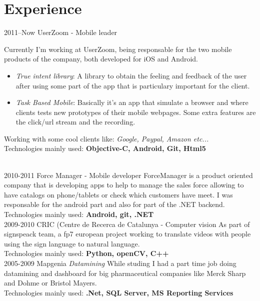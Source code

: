 \documentclass[]{friggeri-cv} %
\begin{document}
\section{Experience}
\begin{entrylist}
\entry
{2011--Now}
{UserZoom - Mobile leader}
{}
{
Currently I'm working at UserZoom, being responsable for the two mobile products of the company, both developed for iOS and Android.

\vspace{\parsep}


\begin{itemize}
\item \emph{True intent library}: A library to obtain the feeling and feedback of the user after using some part of the app that is particulary important for the client.

\vspace{\parsep}
\item \emph{Task Based Mobile}: Basically it's an app that simulate a browser and where clients tests new prototypes of their mobile webpages. Some extra features are the click/url stream and the recording.
\vspace{\parsep}
\end{itemize}
\vspace{\parsep}
Working with some cool clients like: \emph{Google, Paypal, Amazon etc...}\\
\vspace{\parsep}Technologies mainly used: \textbf{Objective-C, Android, Git, Html5}
} 
\\
\entry
{2010-2011}
{Force Manager - Mobile developer}
{}
{
ForceManager is a product oriented company that is developing apps to help to manage the sales force allowing to have catalogs on phone/tablets or check which customers have meet. I was responsable for the android part and also for part of the .NET backend.
\\\vspace{\parsep}Technologies mainly used: \textbf{Android, git, .NET}
}
\\
\entry
{2009-2010}
{CRIC (Centre de Recerca de Catalunya - Computer vision}
{}
{
As part of signspeack team, a fp7 european project working to translate videos with people using the sign language to natural language.
\\\vspace{\parsep}Technologies mainly used: \textbf{Python, openCV, C++}
}
\\
\entry
{2005-2009}
{Mapgenia}
{}
{\emph{Datamining} While studing I had a part time job doing datamining and dashboard for big pharmaceutical companies like Merck Sharp and Dohme or Bristol Mayers.
\\\vspace{\parsep}Technologies mainly used: \textbf{.Net, SQL Server, MS Reporting Services}
}
\end{entrylist}
\end{document}
